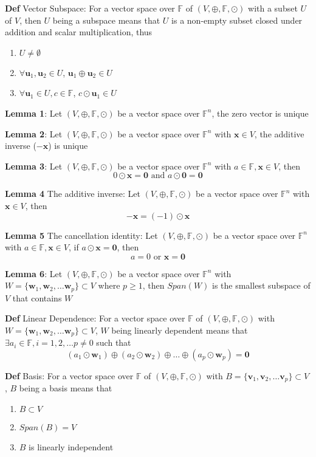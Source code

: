 \documentclass[11pt,notitlepage]{report}
\newcommand{\bb}[1]{\ensuremath{\mathbb{#1}}}
\newcommand{\tbf}[1]{\textbf{#1}}
\begin{document}
\textbf{Def} Vector Subspace: For a vector space over $\bb F$ of $(V, \oplus, \bb F, \odot)$ with a subset $U$ of $V$, then $U$ being a subspace means that $U$ is a  non-empty subset closed under addition and scalar multiplication, thus
\begin{enumerate}
    \item $U \ne \emptyset$
    \item $\forall \tbf u_1, \tbf u_2 \in U$, $\tbf u_1 \oplus \tbf u_2 \in U$
    \item $\forall \tbf u_1 \in U, c \in \bb F$, $c \odot \tbf u_1 \in U$
\end{enumerate}

\textbf{Lemma 1}: Let $(V, \oplus, \bb F, \odot)$ be a vector space over $\bb F^n$, the zero vector is unique

\textbf{Lemma 2}: Let $(V, \oplus, \bb F, \odot)$ be a vector space over $\bb F^n$ with $\tbf x \in V$, the additive inverse ($-\tbf x$) is unique

\textbf{Lemma 3}: Let $(V, \oplus, \bb F, \odot)$ be a vector space over $\bb F^n$ with $a \in \bb F, \tbf x \in V$, then
$$0 \odot \tbf x = \tbf 0 \text{ and } a \odot \tbf 0 = \tbf 0$$

\textbf{Lemma 4} The additive inverse: Let $(V, \oplus, \bb F, \odot)$ be a vector space over $\bb F^n$ with $\tbf x \in V$, then
$$-\tbf x = (-1) \odot \tbf x$$

\textbf{Lemma 5} The cancellation identity: Let $(V, \oplus, \bb F, \odot)$ be a vector space over $\bb F^n$ with $a \in \bb F, \tbf x \in V$, if $a \odot \tbf x = \tbf 0$, then
$$a = 0 \text{ or } \tbf x = \tbf 0$$

\textbf{Lemma 6}: Let $(V, \oplus, \bb F, \odot)$ be a vector space over $\bb F^n$ with $W = \{\tbf w_1, \tbf w_2, \dots \tbf w_p\} \subset V$ where $p \geq 1$, then $Span(W)$ is the smallest subspace of $V$ that contains $W$

\textbf{Def} Linear Dependence: For a vector space over $\bb F$ of $(V, \oplus, \bb F, \odot)$ with $W = \{\tbf w_1, \tbf w_2, \dots \tbf w_p\} \subset V$, $W$ being linearly dependent means that $\exists a_i \in \bb F, i = 1,2, \dots p \ne 0$ such that
$$(a_1 \odot \tbf w_1) \oplus (a_2 \odot \tbf w_2) \oplus \dots \oplus (a_p \odot \tbf w_p) =\tbf 0$$

\textbf{Def} Basis: For a vector space over $\bb F$ of $(V, \oplus, \bb F, \odot)$ with $B = \{\tbf v_1, \tbf v_2, \dots \tbf v_p\} \subset V$, $B$ being a basis means that
\begin{enumerate}
    \item $B \subset V$
    \item $Span(B) = V$
    \item $B$ is linearly independent
\end{enumerate}
\end{document}
